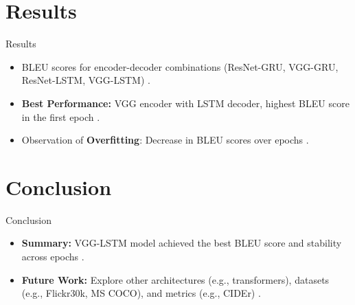 \documentclass[10pt]{beamer}
\theoremstyle{remark}
\begin{document}
\section{Results}
\begin{frame}{Results}
	\begin{itemize}
			\item BLEU scores for encoder-decoder combinations (ResNet-GRU, VGG-GRU, ResNet-LSTM, VGG-LSTM) \cite{he, simonyan}.
				\item \textbf{Best Performance:} VGG encoder with LSTM decoder, highest BLEU score in the first epoch \cite{vinyals:2015}.
				\item Observation of \textbf{Overfitting}: Decrease in BLEU scores over epochs \cite{rennie}.
	\end{itemize}
\end{frame}

\section{Conclusion}
\begin{frame}{Conclusion}
	\begin{itemize}
			\item \textbf{Summary:} VGG-LSTM model achieved the best BLEU score and stability across epochs \cite{vinyals:2016}.
			\item \textbf{Future Work:} Explore other architectures (e.g., transformers), datasets (e.g., Flickr30k, MS COCO), and metrics (e.g., CIDEr) \cite{vedantam}.
	\end{itemize}
\end{frame}

\begin{frame}[allowframebreaks]
	
	
\end{frame}
\end{document}
